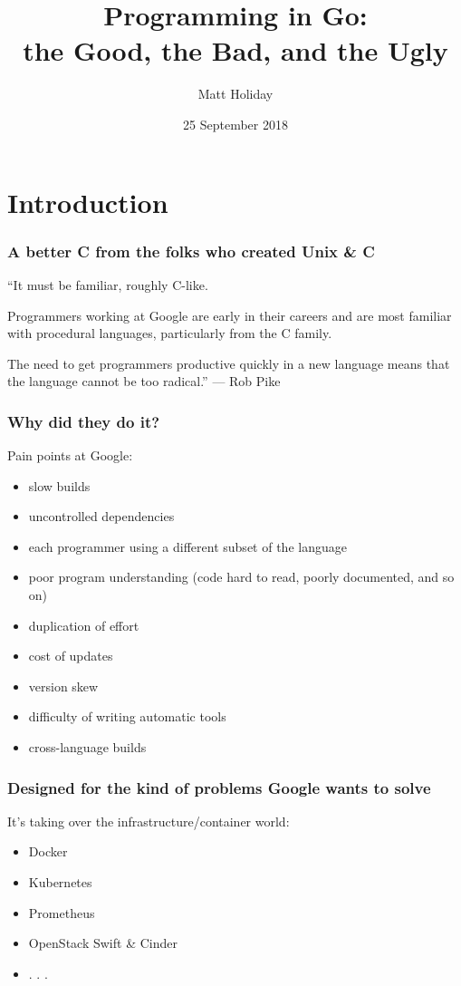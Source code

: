\documentclass[compress,t,11pt]{beamer}
\title[Programming in Go]{\bf Programming in Go:\\ the Good, the Bad, and the Ugly}
\author{Matt Holiday}
\institute[CP]{Cardinal Peak}
\date{25 September 2018}
\begin{document}
\frame{\titlepage} 

\section{Introduction}
\begin{frame}
    \frametitle{A better C from the folks who created Unix \& C}
    { ``It must be familiar, roughly C-like. \par
    \vspace{0.2\baselineskip}
    Programmers working at Google are early in their careers and are most familiar
    with procedural languages, particularly from the C family. \par
    \vspace{0.2\baselineskip}
    The need to get programmers productive quickly in a new language means that the
    language cannot be too radical.'' --- Rob Pike \\}
\end{frame}

\begin{frame}
    \frametitle{Why did they do it?}
    Pain points at Google:
    \begin{itemize}
    \item slow builds
    \item uncontrolled dependencies
    \item each programmer using a different subset of the language
    \item poor program understanding (code hard to read, poorly documented, and so on)
    \item duplication of effort
    \item cost of updates
    \item version skew
    \item difficulty of writing automatic tools
    \item cross-language builds
    \end{itemize}
\end{frame}

\begin{frame}
    \frametitle{Designed for the kind of problems Google wants to solve}
    It's taking over the infrastructure/container world:
    \begin{itemize}
        \item Docker 
        \item Kubernetes 
        \item Prometheus 
        \item OpenStack Swift \& Cinder
        \item . . .
    \end{itemize}
\end{frame}
\end{document}
